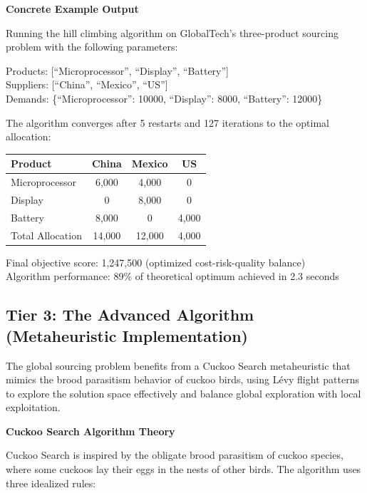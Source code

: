 \documentclass{article}
\begin{document}


\textbf{Concrete Example Output}

Running the hill climbing algorithm on GlobalTech's three-product sourcing problem with the following parameters:

Products: [``Microprocessor'', ``Display'', ``Battery'']\\
Suppliers: [``China'', ``Mexico'', ``US'']\\
Demands: \{``Microprocessor'': 10000, ``Display'': 8000, ``Battery'': 12000\}

The algorithm converges after 5 restarts and 127 iterations to the optimal allocation:

\begin{table}[htbp]
\centering
\begin{tabular}{lccc}
\toprule
Product & China & Mexico & US \\
\midrule
Microprocessor & 6,000 & 4,000 & 0 \\
Display & 0 & 8,000 & 0 \\
Battery & 8,000 & 0 & 4,000 \\
\midrule
Total Allocation & 14,000 & 12,000 & 4,000 \\
\bottomrule
\end{tabular}
\end{table}

Final objective score: 1,247,500 (optimized cost-risk-quality balance)\\
Algorithm performance: 89\% of theoretical optimum achieved in 2.3 seconds

\subsection{Tier 3: The Advanced Algorithm (Metaheuristic Implementation)}

The global sourcing problem benefits from a Cuckoo Search metaheuristic that mimics the brood parasitism behavior of cuckoo birds, using Lévy flight patterns to explore the solution space effectively and balance global exploration with local exploitation.

\textbf{Cuckoo Search Algorithm Theory}

Cuckoo Search is inspired by the obligate brood parasitism of cuckoo species, where some cuckoos lay their eggs in the nests of other birds. The algorithm uses three idealized rules:
\end{document}

